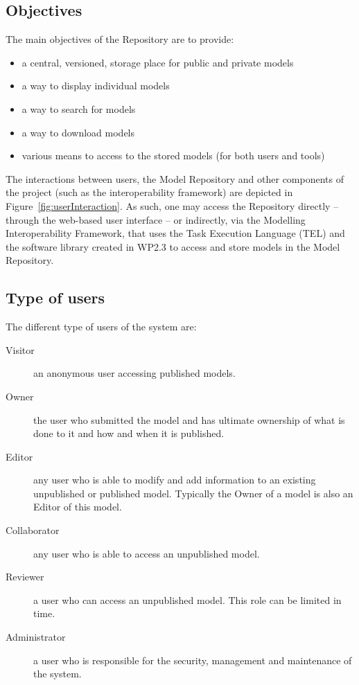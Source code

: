 \subsection{Objectives}
\label{objectives}
The main objectives of the Repository are to provide:
\begin{itemize}
  \item a central, versioned, storage place for public and private models
  \item a way to display individual models
  \item a way to search for models
  \item a way to download models
  \item various means to access to the stored models (for both users and tools)
\end{itemize}

The interactions between users, the Model Repository and other components of the project (such as the interoperability framework) are depicted in Figure~\ref{fig:userInteraction}. As such, one may access the Repository directly -- through the web-based user interface -- or indirectly, via the Modelling Interoperability Framework, that uses the Task Execution Language (TEL) and the software library created in WP2.3 to access and store models in the \ddmore Model Repository.


\subsection{Type of users}
\label{users}
The different type of users of the system are:
\begin{description}
  \item[Visitor] an anonymous user accessing published models.
  \item[Owner] the user who submitted the model and has ultimate ownership of what is done to it and how and
when it is published.
  \item[Editor] any user who is able to modify and add information to an existing unpublished or published model. Typically the Owner of a model is
also an Editor of this model.
  \item[Collaborator] any user who is able to access an unpublished model.
  \item[Reviewer] a user who can access an unpublished model. This role can be limited in time.
  \item[Administrator] a user who is responsible for the security, management and maintenance of the system.
\end{description}

